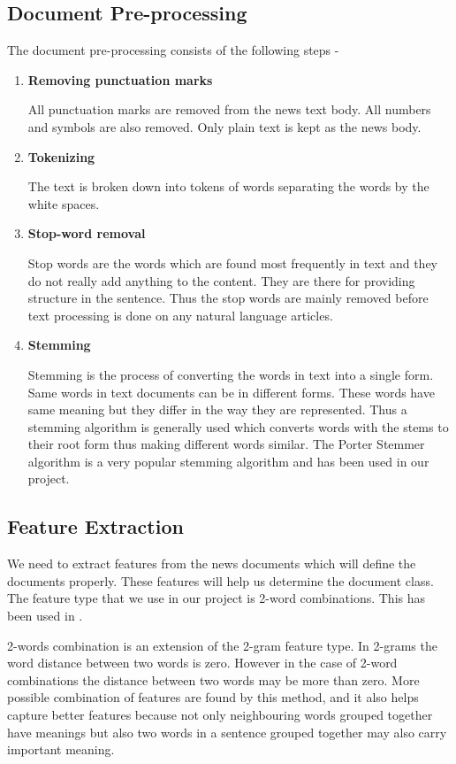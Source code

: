 \documentclass[a4paper,12bp]{report}
\begin{document}
\subsection{Document Pre-processing}
\label{subsec:pre-processing}
The document pre-processing consists of the following steps - 
\begin{enumerate}
\item \textbf{Removing punctuation marks}

All punctuation marks are removed from the news text body. All numbers and symbols are also removed. Only plain text is kept as the news body. 

\item \textbf{Tokenizing}

The text is broken down into tokens of words separating the words by the white spaces. 

\item \textbf{Stop-word removal}

Stop words are the words which are found most frequently in text and they do not really add anything to the content. They are there for providing structure in the sentence. Thus the stop words are mainly removed before text processing is done on any natural language articles. 

\item \textbf{Stemming}

Stemming is the process of converting the words in text into a single form. Same words in text documents can be in different forms. These words have same meaning but they differ in the way they are represented. Thus a stemming algorithm is generally used which converts words with the stems to their root form thus making different words similar. The Porter Stemmer algorithm \cite{porter1980algorithm} is a very popular stemming algorithm and has been used in our project.
\end{enumerate}

\subsection{Feature Extraction}
We need to extract features from the news documents which will define the documents properly. These features will help us determine the document class. The feature type that we use in our project is 2-word combinations. This has been used in \cite{Hagenau:2013}.

2-words combination is an extension of the 2-gram feature type. In 2-grams the word distance between two words is zero. However in the case of 2-word combinations the distance between two words may be more than zero. More possible combination of features are found by this method, and it also helps capture better features because not only neighbouring words grouped together have meanings but also two words in a sentence grouped together may also carry important meaning. 
\end{document}
